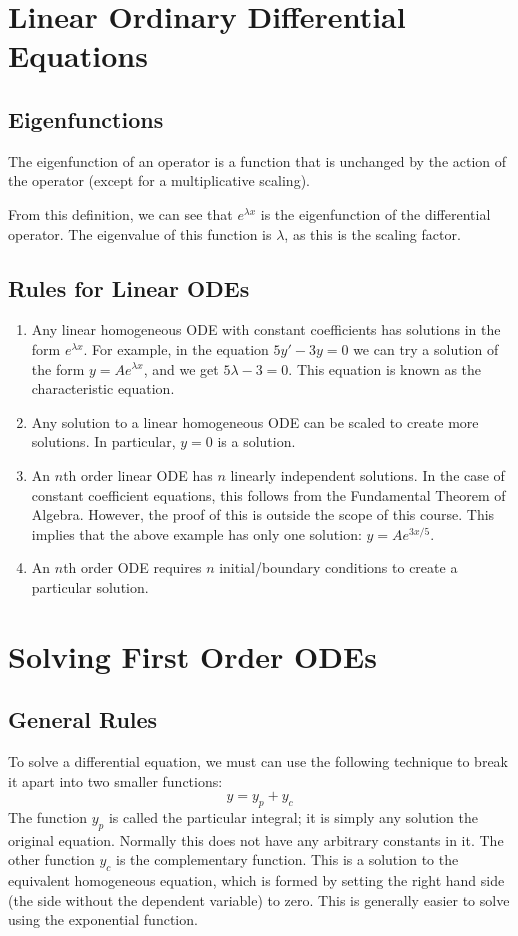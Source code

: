 \documentclass{article}
\begin{document}
\section{Linear Ordinary Differential Equations}
\subsection{Eigenfunctions}
\begin{definition}
	The eigenfunction of an operator is a function that is unchanged by the action of the operator (except for a multiplicative scaling).
\end{definition}
From this definition, we can see that $e^{\lambda x}$ is the eigenfunction of the differential operator. The eigenvalue of this function is $\lambda$, as this is the scaling factor.

\subsection{Rules for Linear ODEs}
\begin{enumerate}
	\item Any linear homogeneous ODE with constant coefficients has solutions in the form $e^{\lambda x}$. For example, in the equation $5y' - 3y = 0$ we can try a solution of the form $y = Ae^{\lambda x}$, and we get $5 \lambda - 3 = 0$. This equation is known as the characteristic equation.
	\item Any solution to a linear homogeneous ODE can be scaled to create more solutions. In particular, $y=0$ is a solution.
	\item An $n$th order linear ODE has $n$ linearly independent solutions. In the case of constant coefficient equations, this follows from the Fundamental Theorem of Algebra. However, the proof of this is outside the scope of this course. This implies that the above example has only one solution: $y = Ae^{3x/5}$.
	\item An $n$th order ODE requires $n$ initial/boundary conditions to create a particular solution.
\end{enumerate}

\section{Solving First Order ODEs}
\subsection{General Rules}
To solve a differential equation, we must can use the following technique to break it apart into two smaller functions:
\[ y = y_p + y_c \]
The function $y_p$ is called the particular integral; it is simply any solution
the original equation. Normally this does not have any arbitrary constants in it. The other function $y_c$ is the complementary function. This is a solution to the equivalent homogeneous equation, which is formed by setting the right hand side (the side without the dependent variable) to zero. This is generally easier to solve using the exponential function.
\end{document}
